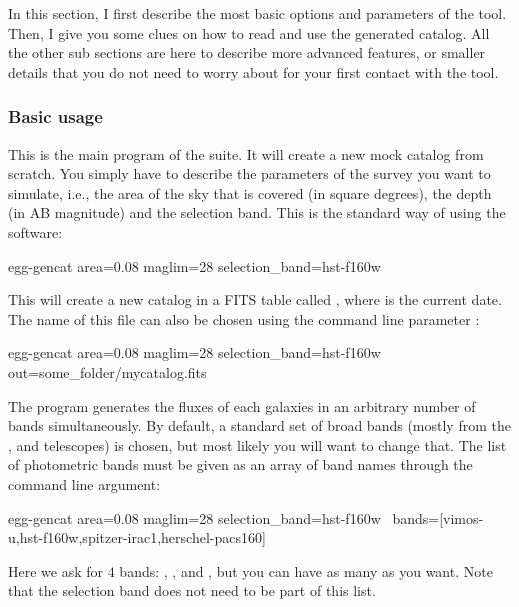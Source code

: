 In this section, I first describe the most basic options and parameters of the tool. Then, I give you some clues on how to read and use the generated catalog. All the other sub sections are here to describe more advanced features, or smaller details that you do not need to worry about for your first contact with the tool.

\subsubsection{Basic usage}

This is the main program of the \egg suite. It will create a new mock catalog from scratch. You simply have to describe the parameters of the survey you want to simulate, i.e., the area of the sky that is covered (in square degrees), the depth (in AB magnitude) and the selection band. This is the standard way of using the software:
\begin{bashcode}
egg-gencat area=0.08 maglim=28 selection_band=hst-f160w
\end{bashcode}
This will create a new catalog in a FITS table called , where \bashinline{[yyyymmdd]} is the current date. The name of this file can also be chosen using the command line parameter :
\begin{bashcode}
egg-gencat area=0.08 maglim=28 selection_band=hst-f160w out=some_folder/mycatalog.fits
\end{bashcode}

The program generates the fluxes of each galaxies in an arbitrary number of bands simultaneously. By default, a standard set of broad bands (mostly from the \hubble, \spitzer and \herschel telescopes) is chosen, but most likely you will want to change that. The list of photometric bands must be given as an array of band names through the  command line argument:
\begin{bashcode}
egg-gencat area=0.08 maglim=28 selection_band=hst-f160w \
    bands=[vimos-u,hst-f160w,spitzer-irac1,herschel-pacs160]
\end{bashcode}
Here we ask for $4$ bands: , ,  and , but you can have as many as you want. Note that the selection band does not need to be part of this list.

